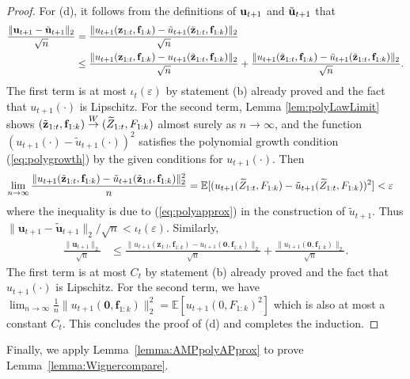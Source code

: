 \documentclass[10pt,reqno]{amsart}
\def\E{\mathbb{E}}
\def\toW{\overset{W}{\to}}
\def\bu{{\mathbf{u}}}
\def\bz{{\mathbf{z}}}
\def\bff{{\mathbf{f}}}
\def\eps{\varepsilon}
\begin{document}
\begin{proof}
For (d), it follows from the 
definitions of $\mathbf{u}_{t+1}$ and $\tilde{\mathbf{u}}_{t+1}$ that
\begin{align*}
\frac{\|\bu_{t+1} - \tilde\bu_{t+1}\|_2}{\sqrt{n}}
&= \frac{\|u_{t+1}(\zb_{1:t}, \fb_{1:k}) 
- \tilde u_{t+1}(\tilde\zb_{1:t}, \fb_{1:k})\|_2}{\sqrt{n}}\\
&\leq \frac{\|u_{t+1}(\bz_{1:t}, \bff_{1:k}) 
- u_{t+1}(\tilde\bz_{1:t},\bff_{1:k})\|_2}{\sqrt{n}}
+ \frac{\|u_{t+1}(\tilde\bz_{1:t}, \fb_{1:k}) 
- \tilde u_{t+1}(\tilde\bz_{1:t},\bff_{1:k})\|_2}{\sqrt{n}}. 
\end{align*}
The first term is at most $\iota_t(\eps)$ by statement (b) already proved and
the fact that $u_{t+1}(\cdot)$ is Lipschitz.
For the second term, Lemma \ref{lem:polyLawLimit} shows
$(\tilde\zb_{1:t}, \fb_{1:k})
\toW (\widetilde Z_{1:t}, F_{1:k})$ almost surely as $n \to \infty$, and the
function $(u_{t+1}(\cdot)-\tilde u_{t+1}(\cdot))^2$ satisfies the polynomial
growth condition (\ref{eq:polygrowth}) by the given conditions for
$u_{t+1}(\cdot)$. Then
\begin{align}\label{eq:u_converge_2}
\lim_{n \to \infty} \frac{\|u_{t+1}(\tilde\zb_{1:t}, \fb_{1:k}) 
- \tilde u_{t+1}(\tilde\zb_{1:t},\fb_{1:k})\|_2^2}{n}
&= \EE[(u_{t+1}(\widetilde Z_{1:t}, F_{1:k}) 
- \tilde u_{t+1}(\widetilde Z_{1:t}, F_{1:k}))^2]<\eps
\end{align}
where the inequality is due to (\ref{eq:polyapprox}) in the construction of
$\tilde u_{t+1}$. Thus
$\|\bu_{t+1} - \tilde\bu_{t+1}\|_2/\sqrt{n}<\iota_t(\eps)$.
Similarly,
\begin{align*}
\frac{\|\bu_{t+1}\|_2}{\sqrt{n}}
&\leq \frac{\|u_{t+1}(\bz_{1:t}, \bff_{1:k}) -
u_{t+1}(\mathbf{0},\bff_{1:k})\|_2}{\sqrt{n}} +
\frac{\|u_{t+1}(\mathbf{0},\bff_{1:k})\|_2}{\sqrt{n}}.
\end{align*}
The first term is at most $C_t$ by statement (b) already proved and the fact
that $u_{t+1}(\cdot)$ is Lipschitz. For the second term, we have 
$\lim_{n \to \infty} \frac{1}{n}\|u_{t+1}(\mathbf{0},\bff_{1:k})\|_2^2
=\E[u_{t+1}(0,F_{1:k})^2]$
which is also at most a constant $C_t$. This concludes the proof of (d) and
completes the induction.
\end{proof}

Finally, we apply Lemma~\ref{lemma:AMPpolyAPprox} to prove 
Lemma~\ref{lemma:Wignercompare}.
\end{document}
